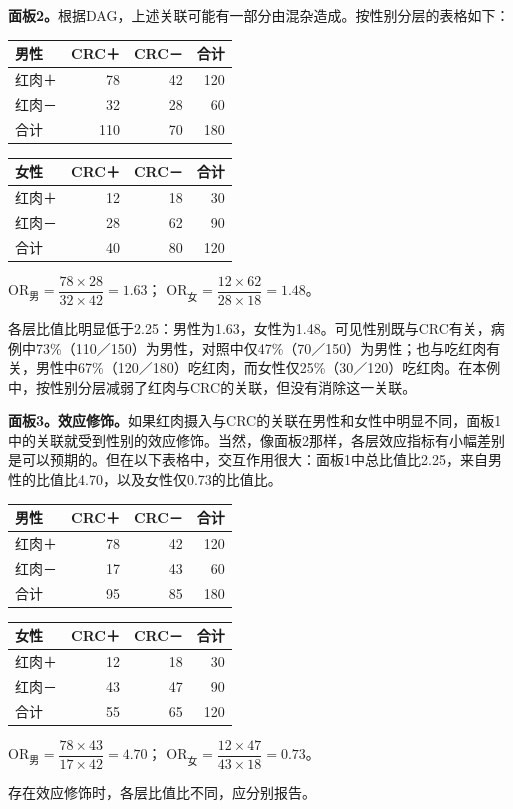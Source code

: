\textbf{面板2。}根据DAG，上述关联可能有一部分由混杂造成。按性别分层的表格如下：
\begin{center}\small
\begin{tabular}{lrrr}\toprule 男性&CRC＋&CRC－&合计\\\midrule
红肉＋&78&42&\textcolor{chTenRed}{120}\\红肉－&32&28&\textcolor{chTenPurple}{60}\\合计&\textcolor{chTenCyan}{110}&\textcolor{chTenTeal}{70}&180\\\bottomrule
\end{tabular}\quad
\begin{tabular}{lrrr}\toprule 女性&CRC＋&CRC－&合计\\\midrule
红肉＋&12&18&\textcolor{chTenRed}{30}\\红肉－&28&62&\textcolor{chTenPurple}{90}\\合计&\textcolor{chTenCyan}{40}&\textcolor{chTenTeal}{80}&120\\\bottomrule
\end{tabular}
\par\medskip $\mathrm{OR}_{\text{男}}=\dfrac{78\times28}{32\times42}=1.63$；\quad
$\mathrm{OR}_{\text{女}}=\dfrac{12\times62}{28\times18}=1.48$。
\end{center}
各层比值比明显低于2.25：男性为1.63，女性为1.48。可见性别既与CRC有关，病例中73\%（110／150）为男性，对照中仅47\%（70／150）为男性；也与吃红肉有关，男性中67\%（120／180）吃红肉，而女性仅25\%（30／120）吃红肉。在本例中，按性别分层减弱了红肉与CRC的关联，但没有消除这一关联。

\textbf{面板3。效应修饰。}如果红肉摄入与CRC的关联在男性和女性中明显不同，面板1中的关联就受到性别的效应修饰。当然，像面板2那样，各层效应指标有小幅差别是可以预期的。但在以下表格中，交互作用很大：面板1中总比值比2.25，来自男性的比值比4.70，以及女性仅0.73的比值比。
\begin{center}\small
\begin{tabular}{lrrr}\toprule 男性&CRC＋&CRC－&合计\\\midrule
红肉＋&78&42&120\\红肉－&17&43&60\\合计&95&85&180\\\bottomrule
\end{tabular}\quad
\begin{tabular}{lrrr}\toprule 女性&CRC＋&CRC－&合计\\\midrule
红肉＋&12&18&30\\红肉－&43&47&90\\合计&55&65&120\\\bottomrule
\end{tabular}
\par\medskip $\mathrm{OR}_{\text{男}}=\dfrac{78\times43}{17\times42}=4.70$；\quad
$\mathrm{OR}_{\text{女}}=\dfrac{12\times47}{43\times18}=0.73$。
\end{center}
存在效应修饰时，各层比值比不同，应分别报告。

